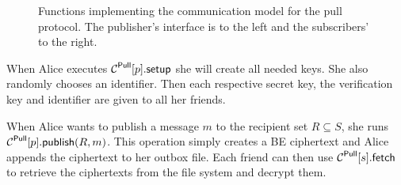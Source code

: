 \begin{figure}%
  \caption{%
    Functions implementing the communication model for the pull protocol.
    The publisher's interface is to the left and the subscribers' to the right.
  }\label{PullFunctions}
\end{figure}

When Alice executes \(\psetup{p}\) she will create all needed keys.
She also randomly chooses an identifier.
Then each respective secret key, the verification key and identifier are given 
to all her friends.

When Alice wants to publish a message \(m\) to the recipient set \(R\subseteq 
  S\), she runs \(\ppub{p}[R][m]\).
This operation simply creates a \ac{BE} ciphertext and Alice appends the 
ciphertext to her outbox file.
Each friend can then use \(\pget{s}\) to retrieve the ciphertexts from the file 
system and decrypt them.

